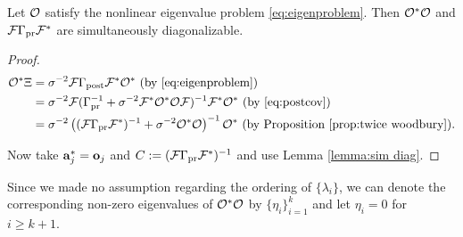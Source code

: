 \begin{proposition}\label{prop:same ev}
  Let $\mathcal{O}$ satisfy the nonlinear eigenvalue problem
  \eqref{eq:eigenproblem}. Then $\mathcal{O}^*\mathcal{O}$ and $\mathcal{F} \Gamma_{\textup{pr}} \mathcal{F}^*$
  are simultaneously diagonalizable.
\end{proposition}
\begin{proof}
  \begin{align}\label{eq:mod conditions}
    \begin{split}
      \obs^* \Xi &= \sigma^{-2}\fwd \postcov \fwd^* \obs^*  \text{ (by \eqref{eq:eigenproblem})}\\
      &= \sigma^{-2} \fwd( \prcov^{-1} + \sigma^{-2}  \fwd^* \obs^* \obs \fwd )^{-1} \fwd^* \obs^*  \text{ (by \eqref{eq:postcov})} \\
      &= \sigma^{-2} \left ( (\fwd\prcov\fwd^*)^{-1} + \sigma^{-2}  \obs^* \obs \right )^{-1} \obs^* \text{ (by Proposition \ref{prop:twice woodbury})}.
    \end{split}
  \end{align}

  Now take $\mathbf{a}_j^{*} = \mathbf{o}_j$ and $C := (\mathcal{F} \Gamma_{\textup{pr}}
  \mathcal{F}^*)^{-1}$ and use Lemma \ref{lemma:sim diag}.
\end{proof}

Since we made no assumption regarding the ordering of $\{\lambda_i\}$,
we can denote the corresponding non-zero eigenvalues of $\mathcal{O}^*\mathcal{O}$
by $\{\eta_i\}_{i=1}^{k}$ and let $\eta_i = 0$ for $i \geq k+1$.


